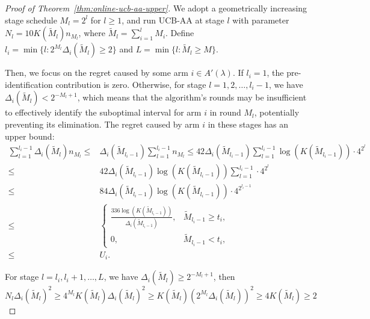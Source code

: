 \documentclass[
  12pt]{article}
\begin{document}
\begin{proof}[Proof of Theorem~\ref{thm:online-ucb-aa-upper}]
We adopt a geometrically increasing stage schedule $M_l=2^l$ for $l\geq1$, and run UCB-AA at stage $l$ with parameter $N_l=10K(\tilde{M}_l)n_{M_l}$, where $\tilde{M}_l=\sum_{i=1}^l M_i$.
Define $l_i=\min\{l:2^{M_l}\Delta_i(\tilde{M}_l)\geq 2\}$ and $L=\min\{l:\tilde{M}_l\geq M\}$.

Then, we focus on the regret caused by some arm $i\in A'(\lambda)$. If
$l_i=1$, the pre-identification contribution is zero. Otherwise, for stage
$l=1,2,\dots,l_i-1$, we have
$\Delta_i(\tilde{M}_l)< 2^{-M_l+1}$, which means that the algorithm's rounds
may be insufficient to effectively identify the suboptimal interval for arm $i$
in round $M_l$, potentially preventing its elimination. The regret caused by
arm $i$ in these stages has an upper bound:
\begin{align*}
    \sum_{l=1}^{l_i-1} \Delta_i(\tilde{M}_l)n_{M_l} \leq & \Delta_i(\tilde{M}_{l_i-1}) \sum_{l=1}^{l_i-1} n_{M_l} \leq   42\Delta_i(\tilde{M}_{l_i-1})  \sum_{l=1}^{l_i-1} \log(K(\tilde{M}_{l_i-1})) \cdot 4^{2^l}  \\
    \leq & 42 \Delta_i(\tilde{M}_{l_i-1})\log(K(\tilde{M}_{l_i-1}))  \sum_{l=1}^{l_i-1} \cdot 4^{2^l} \\
    \leq & 84 \Delta_i(\tilde{M}_{l_i-1})\log(K(\tilde{M}_{l_i-1}))   \cdot 4^{2^{l_i-1}} \\
    \leq & \begin{cases}
    \displaystyle
    \frac{336\log(K(\tilde{M}_{l_i-1}))}{\Delta_i(\tilde{M}_{l_i-1})},
    & \tilde{M}_{l_i-1}\ge t_i,\\[1.2ex]
    0, & \tilde{M}_{l_i-1}<t_i,
    \end{cases}\\
    \leq & U_i.
\end{align*}

For stage $l=l_i,l_i+1,\dots,L$, we have $\Delta_i(\tilde{M}_l)\geq 2^{-M_l+1}$, then $$N_l\Delta_i(\tilde{M}_l)^2 \geq 4^{M_l}K(\tilde{M}_l) \Delta_i(\tilde{M}_l)^2 \geq K(\tilde{M}_l)(2^{M_l}\Delta_i(\tilde{M}_l))^2\geq 4K(\tilde{M}_l)\geq 2 $$


\end{proof}
\end{document}
